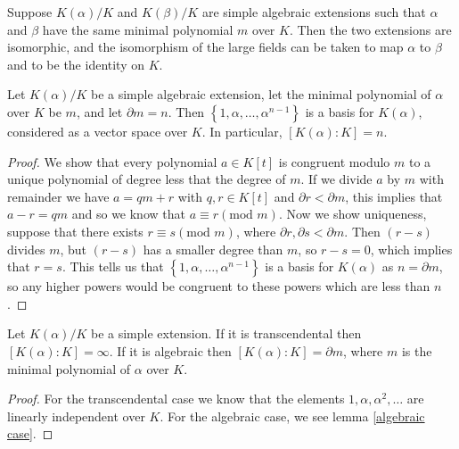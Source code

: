 \begin{corollary}
    Suppose $K(\alpha) / K$ and $K(\beta) / K$ are simple algebraic extensions such that $\alpha$ and $\beta$ have the same minimal polynomial $m$ over $K$. Then the two extensions are isomorphic, and the isomorphism of the large fields can be taken to map $\alpha$ to $\beta$ and to be the identity on $K$.
\end{corollary}

\begin{lemma}
    Let $K(\alpha) / K$ be a simple algebraic extension, let the minimal polynomial of $\alpha$ over $K$ be $m$, and let $\partial m=n$. Then $\left\{1, \alpha, \ldots, \alpha^{n-1}\right\}$ is a basis for $K(\alpha)$, considered as a vector space over $K$. In particular, \([K(\alpha):K]=n\). \label{algebraic case}
\end{lemma}

\begin{proof}
    We show that every polynomial \(a \in K[t]\) is congruent modulo \(m\) to a unique polynomial of degree less that the degree of \(m\). If we divide \(a\) by \(m\) with remainder we have \(a = qm + r\) with \(q,r \in K[t]\) and \(\partial r < \partial m\), this implies that \(a - r =qm\) and so we know that \(a \equiv r (\text{mod } m)\). Now we show uniqueness, suppose that there exists \(r \equiv s(\text{mod }m)\), where \(\partial r, \partial s < \partial m\). Then \((r - s)\) divides \(m\), but \((r-s)\) has a smaller degree than \(m\), so \(r-s=0\), which implies that \(r=s\). This tells us that $\left\{1, \alpha, \ldots, \alpha^{n-1}\right\}$ is a basis for \(K(\alpha)\) as \(n = \partial m\), so any higher powers would be congruent to these powers which are less than \(n\).
    \end{proof}

\begin{theorem} \label{thm:degree-theorem}
    Let $K(\alpha) / K$ be a simple extension. If it is transcendental then $[K(\alpha): K]=\infty$. If it is algebraic then $[K(\alpha): K]=\partial m$, where $m$ is the minimal polynomial of $\alpha$ over $K$. \label{finite degree theorem}
\end{theorem}

\begin{proof}
For the transcendental case we know that the elements $1, \alpha, \alpha^2, \ldots$ are linearly independent over $K$. For the algebraic case, we see lemma \ref{algebraic case}.
\end{proof}

